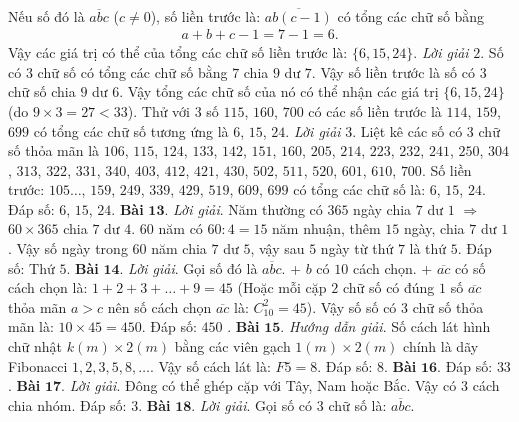 \begin{multicols}{2}
\begin{align*}
		\end{align*}
	Nếu số đó là $\overline{abc}$ ($c\ne0$), số liền trước là: $\overline{ab(c-1)}$ có tổng các chữ số bằng
	\begin{align*}
			a+b+c-1=7-1=6.
		\end{align*}
	Vậy các giá trị có thể của tổng các chữ số liền trước là: $\{6,15,24\}$.
	\vskip 0.1cm 
	\textit{Lời giải} $2$.
	Số có $3$ chữ số có tổng các chữ số bằng $7$ chia $9$ dư $7$. Vậy số liền trước là số có $3$ chữ số chia $9$ dư $6$. Vậy tổng các chữ số của nó có thể nhận các giá trị $\{6,15,24\}$ (do $9\times 3 = 27 < 33$). Thử với $3$ số $115$, $160$, $700$ có các số liền trước là $114$, $159$, $699$ có tổng các chữ số tương ứng là $6$, $15$, $24$.
	\vskip 0.1cm
	\textit{Lời giải} $3$. Liệt kê các số có $3$ chữ số thỏa mãn là $106$, $115$, $124$, $133$, $142$, $151$, $160$, $205$, $214$, $223$, $232$, $241$, $250$, $304$, $313$, $322$, $331$, $340$, $403$, $412$, $421$, $430$, $502$, $511$, $520$, $601$, $610$, $700$.
	\vskip 0.1cm
	Số liền trước: $105\ldots$, $159$, $249$, $339$, $429$, $519$, $609$, $699$ có tổng các chữ số là: $6$, $15$, $24$.
	\vskip 0.1cm
	Đáp số: $6$, $15$, $24$.
	\vskip 0.1cm
	\textbf{\color{cackithi}Bài} $\pmb{13.}$ \textit{Lời giải}.
	Năm thường có $365$ ngày chia $7$ dư $1$ $\Rightarrow$ $60\times 365$ chia $7$ dư $4$.
	\vskip 0.1cm
	$60$ năm có $60:4=15$ năm nhuận, thêm $15$ ngày, chia $7$ dư $1$.
	\vskip 0.1cm
	Vậy số ngày trong $60$ năm chia $7$ dư $5$, vậy sau $5$ ngày từ thứ $7$ là thứ $5$.
	\vskip 0.1cm
	Đáp số: Thứ $5$.
	\vskip 0.1cm
	\textbf{\color{cackithi}Bài} $\pmb{14.}$ \textit{Lời giải}.
	Gọi số đó là $\overline{abc}$.
	\vskip 0.1cm
	+ $b$ có $10$ cách chọn.
	\vskip 0.1cm
	+ $\overline{ac}$ có số cách chọn là: $1+2+3+\ldots+9 = 45$ (Hoặc mỗi cặp $2$ chữ số có đúng $1$ số $\overline{ac}$ thỏa mãn $a>c$ nên số cách chọn $\overline{ac}$ là: $C^2_{10} = 45$).
	\vskip 0.1cm
	Vậy số số có $3$ chữ số thỏa mãn là: $10\times45=450$.
	\vskip 0.1cm
	Đáp số: $450$ .
	\vskip 0.1cm
	\textbf{\color{cackithi}Bài} $\pmb{15.}$ \textit{Hướng dẫn giải}.
	Số cách lát hình chữ nhật $k(m) \times 2(m)$ bằng các viên gạch $1(m)\times2(m)$ chính là dãy Fibonacci $1,2,3,5,8,\ldots$. Vậy số cách lát là: $F5 = 8$.
	\vskip 0.1cm
	Đáp số: $8$.
	\vskip 0.1cm
	\textbf{\color{cackithi}Bài} $\pmb{16.}$ Đáp số: $33$.
	\vskip 0.1cm 
	\textbf{\color{cackithi}Bài} $\pmb{17.}$ \textit{Lời giải}. Đông có thể ghép cặp với Tây, Nam hoặc Bắc. Vậy có $3$ cách chia nhóm.
	\vskip 0.1cm
	Đáp số: $3$.
	\vskip 0.1cm
	\textbf{\color{cackithi}Bài} $\pmb{18.}$ \textit{Lời giải}.
	Gọi số có $3$ chữ số là: $\overline{abc}$.

\end{multicols}

